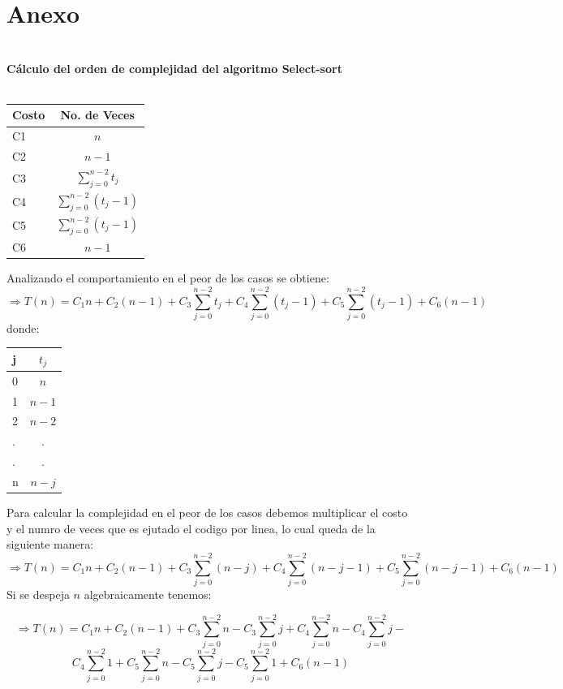 \documentclass[12pt,twoside]{article}
\begin{document}
\section{Anexo} 
\text{}\\ 
\textbf{Cálculo del orden de complejidad del
algoritmo Select-sort}\\ 
\\ 

\begin{center}
  \begin{tabular}{ l | c }
    Costo & No. de Veces\\ \hline
    C1 & $n$ \\
    C2 & $n-1$ \\ 
    C3 & $\sum_{j=0}^{n-2}t_{j}$ \\
    C4 & $\sum_{j=0}^{n-2}(t_{j}-1)$ \\
    C5 & $\sum_{j=0}^{n-2}(t_{j}-1)$ \\ 
    C6 & $n-1$ \\
  \end{tabular}
\end{center}
Analizando el comportamiento en el peor de los casos se obtiene:\\
\[\Rightarrow T(n) = C_{1}n + C_{2}(n-1) + 
C_{3}\sum_{j=0}
^{n-2}t_{j} +  
C_{4}\sum_{j=0}^{n-2}(t_{j}-1) +
C_{5}\sum_{j=0}^{n-2}(t_{j}-1) + C_{6}(n-1)\] 
donde:
\begin{center}
  \begin{tabular}{ l | c }
    j & $t_{j}$\\ \hline
    0 & $n$ \\
    1 & $n-1$ \\ 
    2 & $n-2$ \\
    . & . \\
    . & . \\ 
    n & $n-j$ \\
  \end{tabular}
\end{center}
Para calcular la complejidad en el peor de los casos debemos multiplicar
el costo y el numro de veces que es ejutado el codigo por linea, lo cual queda de la siguiente manera:
\[\Rightarrow T(n) = C_{1}n + C_{2}(n-1) + 
C_{3}\sum_{j=0}^{n-2}(n-j) +  
C_{4}\sum_{j=0}^{n-2}(n-j-1) +
C_{5}\sum_{j=0}^{n-2}(n-j-1) + C_{6}(n-1)\] 
Si se despeja $n$ algebraicamente tenemos:
\begin{center}
\[\Rightarrow T(n) = C_{1}n + C_{2}(n-1) + 
C_{3}\sum_{j=0}^{n-2}n -
C_{3}\sum_{j=0}^{n-2}j +  
C_{4}\sum_{j=0}^{n-2}n -
C_{4}\sum_{j=0}^{n-2}j -\]\[
C_{4}\sum_{j=0}^{n-2}1 +
C_{5}\sum_{j=0}^{n-2}n -
C_{5}\sum_{j=0}^{n-2}j - 
C_{5}\sum_{j=0}^{n-2}1 + 
C_{6}(n-1)\]
\end{center}
\end{document}
